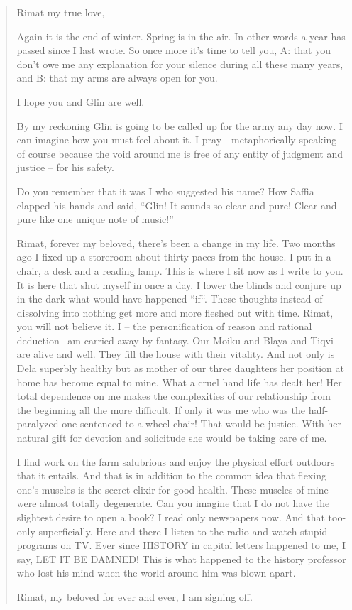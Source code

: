 \documentclass[twoside,11pt]{book}
\begin{document}
\begin{quotation}
  
Rimat my true love,

Again it is the end of winter. Spring is in the air. In other words a year has passed since I last wrote. So once more
it's time to tell you, A: that you don't owe me any explanation for your silence during all these many years, and B:
that my arms are always open for you.

I hope you and Glin are well.

By my reckoning Glin is going to be called up for the army any day now. I can imagine how you must feel about it. I pray
- metaphorically speaking of course because the void around me is free of any entity of judgment and justice -- for his
safety.

Do you remember that it was I who suggested his name? How Saffia clapped his hands and said, ``Glin! It
sounds so clear and pure! Clear and pure like one unique note of music!''

Rimat, forever my beloved, there's been a change in my life. Two months ago I fixed up a storeroom about thirty paces
from the house. I put in a chair, a desk and a reading lamp. This is where I sit now as I write to you. It is here that
shut myself in once a day. I lower the blinds and conjure up in the dark what would have happened
``if``.  These thoughts instead of dissolving into nothing get more and more fleshed out with
time. Rimat, you will not believe it. I -- the personification of reason and rational deduction --am carried away by
fantasy.  Our Moiku and Blaya and Tiqvi are alive and well. They fill the house with their vitality. And not only is
Dela superbly healthy but as mother of our three daughters her position at home has become equal to mine. What a cruel
hand life has dealt her! Her total dependence on me makes the complexities of our relationship from the beginning all
the more difficult. If only it was me who was the half-paralyzed one sentenced to a wheel chair! That would be
justice. With her natural gift for devotion and solicitude she would be taking care of me.

I find work on the farm salubrious and enjoy the physical effort outdoors that it entails.  And that is in addition to
the common idea that flexing one's muscles is the secret elixir for good health. These muscles of mine were almost
totally degenerate. Can you imagine that I do not have the slightest desire to open a book? I read only newspapers now.
And that too- only superficially. Here and there I listen to the radio and watch stupid programs on TV. Ever since
HISTORY in capital letters happened to me, I say, LET IT BE DAMNED! This is what happened to the history professor who
lost his mind when the world around him was blown apart.

Rimat, my beloved for ever and ever, I am signing off.
\end{quotation}
\end{document}
